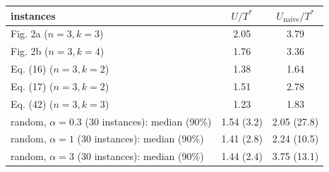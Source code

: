 \begin{tabular}{lcc}
\toprule
instances & $U/T^*$ & $U_{\mathrm{naive}}/T^*$ \\
\midrule
Fig. 2a ($n=3, k=3$) & 2.05 & 3.79 \\
Fig. 2b ($n=3, k=4$) & 1.76 & 3.36 \\
Eq. (16) ($n=3, k=2$) & 1.38 & 1.64 \\
Eq. (17) ($n=3, k=2$) & 1.51 & 2.78 \\
Eq. (42) ($n=3, k=3$) & 1.23 & 1.83 \\
random, $\alpha=0.3$ (30 instances): median (90\%) & 1.54 (3.2) & 2.05 (27.8) \\
random, $\alpha=1$ (30 instances): median (90\%) & 1.41 (2.8) & 2.24 (10.5) \\
random, $\alpha=3$ (30 instances): median (90\%) & 1.44 (2.4) & 3.75 (13.1) \\
\bottomrule
\end{tabular}
